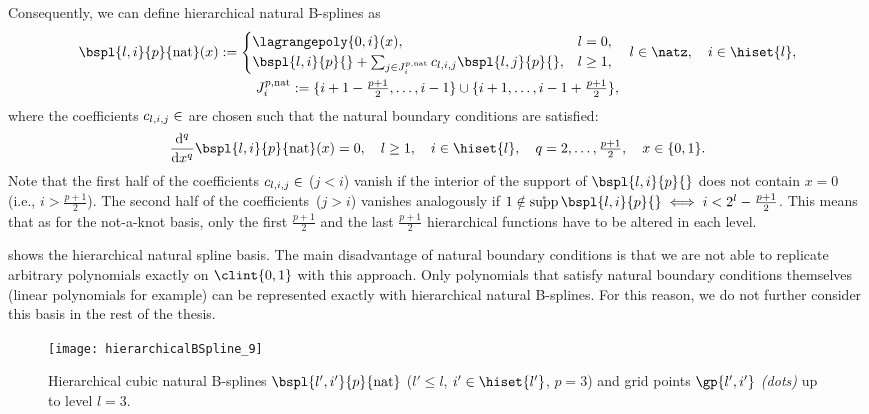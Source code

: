 Consequently, we can define hierarchical natural B-splines as
\begin{subequations}
  \begin{gather}
    \bspl{l,i}{p}{\ntrl}(x)
    :=
    \begin{cases}
      \lagrangepoly{0,i}(x),&
      l = 0,\\
      \bspl{l,i}{p}{} +
      \sum_{j \in J_i^{p,\ntrl}} c_{l,i,j} \bspl{l,j}{p}{},&
      l \ge 1,
    \end{cases}\quad
    l \in \natz,\quad
    i \in \hiset{l},\\
    J_i^{p,\ntrl}
    := \{i+1-\tfrac{p+1}{2}, \dotsc, i-1\} \cup
    \{i+1, \dotsc, i-1+\tfrac{p+1}{2}\},
  \end{gather}
\end{subequations}
where the coefficients $c_{l,i,j} \in \real$ are chosen such that
the natural boundary conditions are satisfied:
\begin{equation}
  \frac{\diff^q}{\dx^q} \bspl{l,i}{p}{\ntrl}(x)
  = 0,\quad
  l \ge 1,\quad
  i \in \hiset{l},\quad
  q = 2, \dotsc, \tfrac{p+1}{2},\quad
  x \in \{0, 1\}.
\end{equation}
Note that the first half of the coefficients $c_{l,i,j} \in \real$
($j < i$) vanish if the interior of the support of $\bspl{l,i}{p}{}$
does not contain $x = 0$
(i.e., $i > \tfrac{p+1}{2}$).
The second half of the coefficients~($j > i$) vanishes analogously
if $1 \notin \interiorsupp \bspl{l,i}{p}{} \iff i < 2^l - \tfrac{p+1}{2}$.
This means that as for the not-a-knot basis,
only the first $\tfrac{p+1}{2}$ and the last $\tfrac{p+1}{2}$
hierarchical functions have to be altered in each level.

 shows the hierarchical natural spline basis.
The main disadvantage of natural boundary conditions is that
we are not able to replicate arbitrary polynomials exactly on $\clint{0, 1}$
with this approach.
Only polynomials that satisfy natural boundary conditions themselves
(linear polynomials for example)
can be represented exactly with hierarchical natural B-splines.
For this reason, we do not further consider this basis in the
rest of the thesis.

\begin{SCfigure}
  \texttt{[image: hierarchicalBSpline\_9]}%
  \caption[%
    Hierarchical natural B-splines%
  ]{%
    Hierarchical cubic natural B-splines
    $\bspl{l',i'}{p}{\ntrl}$
    ($l' \le l$, $i' \in \hiset{l'}$, $p = 3$) and
    grid points $\gp{l',i'}$ \emph{(dots)} up to level $l = 3$.%
  }%
  \label{fig:naturalBSpline}%
\end{SCfigure}
